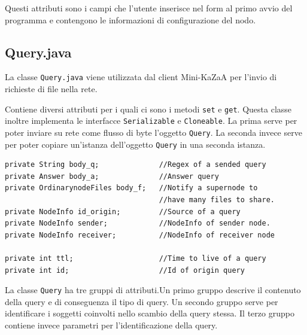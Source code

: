 Questi attributi sono i campi che l'utente inserisce nel form al primo avvio del programma e contengono le informazioni di configurazione del nodo. 

\subsection{Query.java}
La classe \verb|Query.java| viene utilizzata dal client Mini-KaZaA per l'invio di richieste di file nella rete.

Contiene diversi attributi per i quali ci sono i metodi \verb|set| e \verb|get|. Questa classe inoltre implementa
le interfacce \verb|Serializable| e \verb|Cloneable|.
La prima serve per poter inviare su rete come flusso di byte l'oggetto \verb|Query|. La seconda invece serve per poter
copiare un'istanza dell'oggetto \verb|Query| in una seconda istanza.
\newline
\begin{lstlisting}
private String body_q;              //Regex of a sended query
private Answer body_a;              //Answer query
private OrdinarynodeFiles body_f;   //Notify a supernode to 
                                 	//have many files to share.
private NodeInfo id_origin;         //Source of a query
private NodeInfo sender;            //NodeInfo of sender node.
private NodeInfo receiver;          //NodeInfo of receiver node

private int ttl;                    //Time to live of a query
private int id;                     //Id of origin query
\end{lstlisting}

La classe \verb|Query| ha tre gruppi di attributi.Un primo gruppo descrive il contenuto della query e di conseguenza
il tipo di query. Un secondo gruppo serve per identificare i soggetti coinvolti nello scambio della query stessa.
Il terzo gruppo contiene invece parametri per l'identificazione della query. 

